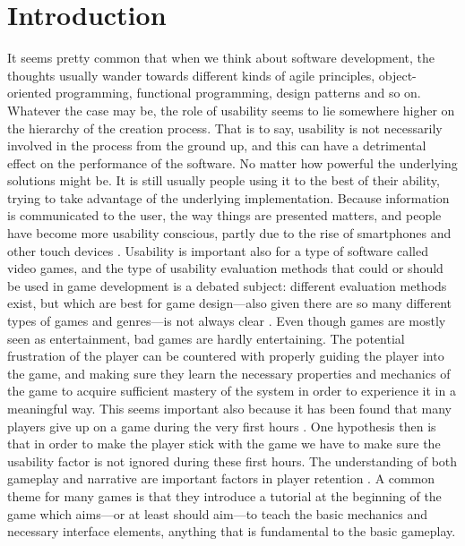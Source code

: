 \chapter{Introduction}
It seems pretty common that when we think about software development, the thoughts usually wander towards different kinds of agile principles, object-oriented programming, functional programming, design patterns and so on. Whatever the case may be, the role of usability seems to lie somewhere higher on the hierarchy of the creation process. That is to say, usability is not necessarily involved in the process from the ground up, and this can have a detrimental effect on the performance of the software. No matter how powerful the underlying solutions might be. It is still usually people using it to the best of their ability, trying to take advantage of the underlying implementation. Because information is communicated to the user, the way things are presented matters, and people have become more usability conscious, partly due to the rise of smartphones and other touch devices \cite{Chen2015}. Usability is important also for a type of software called video games, and the type of usability evaluation methods that could or should be used in game development is a debated subject: different evaluation methods exist, but which are best for game design---also given there are so many different types of games and genres---is not always clear \cite{Bernhaupt2007}. Even though games are mostly seen as entertainment, bad games are hardly entertaining. The potential frustration of the player can be countered with properly guiding the player into the game, and making sure they learn the necessary properties and mechanics of the game to acquire sufficient mastery of the system in order to experience it in a meaningful way. This seems important also because it has been found that many players give up on a game during the very first hours \cite{Bauckhage2012}. One hypothesis then is that in order to make the player stick with the game we have to make sure the usability factor is not ignored during these first hours. The understanding of both gameplay and narrative are important factors in player retention \cite{Cheung2014}. A common theme for many games is that they introduce a tutorial at the beginning of the game which aims---or at least should aim---to teach the basic mechanics and necessary interface elements, anything that is fundamental to the basic gameplay. 

